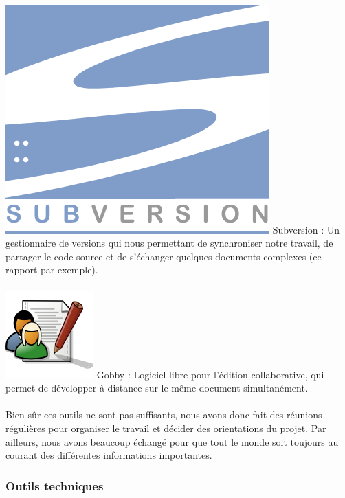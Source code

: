 \documentclass{report}
\begin{document}
			\paragraph{}
			\includegraphics[scale=1]{../logos/subversion-logo.png} 
			Subversion : Un gestionnaire de versions qui nous permettant de synchroniser notre travail, de partager le code source et de s'échanger quelques documents complexes (ce rapport par exemple).
			\paragraph{}
			\includegraphics[scale=0.25]{../logos/Gobby-logo.png} 
			Gobby :
			Logiciel libre pour l'édition collaborative, qui permet de développer à distance sur le même document simultanément. \\

			\paragraph{} Bien sûr ces outils ne sont pas suffisants, nous avons donc fait des réunions régulières pour organiser le travail et décider des orientations du projet. Par ailleurs, nous avons beaucoup échangé pour que tout le monde soit toujours au courant des différentes informations importantes.
			
			\subsubsection{Outils techniques}
\end{document}
